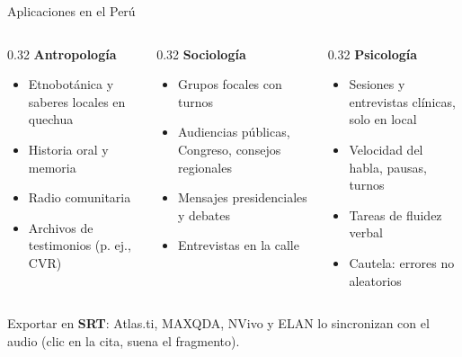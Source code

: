 \documentclass[aspectratio=169,11pt]{beamer}
\begin{document}
\begin{frame}{Aplicaciones en el Perú}
  \begin{columns}[T]
    \begin{column}{0.32\textwidth}
      \textbf{Antropología}
      \small
      \begin{itemize}
        \item Etnobotánica y saberes locales en quechua
        \item Historia oral y memoria
        \item Radio comunitaria
        \item Archivos de testimonios (p. ej., CVR)
      \end{itemize}
    \end{column}
    \begin{column}{0.32\textwidth}
      \textbf{Sociología}
      \small
      \begin{itemize}
        \item Grupos focales con turnos
        \item Audiencias públicas, Congreso, consejos regionales
        \item Mensajes presidenciales y debates
        \item Entrevistas en la calle
      \end{itemize}
    \end{column}
    \begin{column}{0.32\textwidth}
      \textbf{Psicología}
      \small
      \begin{itemize}
        \item Sesiones y entrevistas clínicas, \alert{solo en local}
        \item Velocidad del habla, pausas, turnos
        \item Tareas de fluidez verbal
        \item Cautela: errores no aleatorios
      \end{itemize}
    \end{column}
  \end{columns}
  \vspace{8pt}
  \small Exportar en \textbf{SRT}: Atlas.ti, MAXQDA, NVivo y ELAN lo sincronizan con el audio (clic en la cita, suena el fragmento).
\end{frame}
\end{document}
